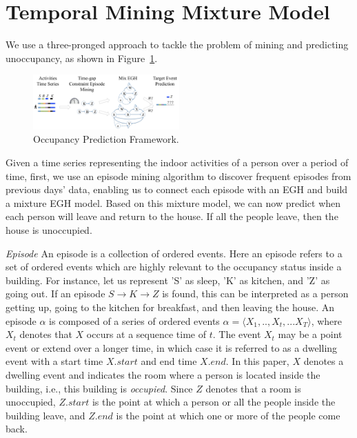\section{Temporal Mining Mixture Model}
We use a three-pronged approach to tackle the problem of mining and predicting unoccupancy, as 
shown in Figure~\ref{fig_framework}.
\begin{figure}[h]
\centering
\includegraphics[width=0.5\textwidth]{adlfigs/framework.pdf}
\caption{Occupancy Prediction Framework.\label{fig_framework}}
\end{figure}
Given a time series representing the indoor activities of a person over a period of time, 
first, we use an episode mining algorithm to discover frequent episodes from previous days' data, enabling us to connect each episode with an EGH and build a mixture EGH model. 
Based on this mixture model, we can now predict when each person will leave and return to the house. 
If all the people leave, then the house is unoccupied. 


\textit{Episode} 
An episode is a collection of ordered events. 
Here an episode refers to a set of ordered events which are 
highly relevant to the occupancy status inside a building. 
For instance, let us represent 'S' as sleep, 
'K' as kitchen, and 'Z' as going out. 
If an episode $S \rightarrow K \rightarrow Z$ is found, 
this can be interpreted as a person getting up, 
going to the kitchen for breakfast, and then leaving the house. 
An episode $\alpha$ is composed 
of a series of ordered events
$\alpha=\langle X_1,..,X_t,...X_T \rangle$, 
where $X_t$ denotes that $X$ occurs at a sequence time of $t$.  
The event $X_t$ may be a point event or extend over a longer time, 
in which case it is referred to as a dwelling event with a start time $X.start$ and end time $X.end$. 
In this paper, $X$ denotes a dwelling event and 
indicates the room where a person is located
inside the building, i.e., this building is \emph{occupied}. 
Since $Z$ denotes that a room is unoccupied, 
$Z.start$ is the point at which a person or all the people inside the building leave, and 
$Z.end$ is the point at which one or more of the people come back. 

